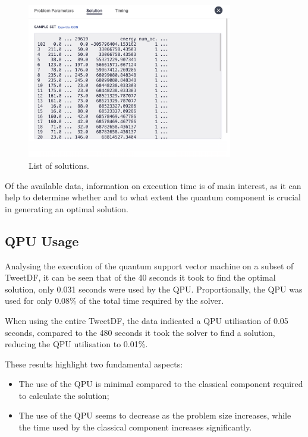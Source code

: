 \begin{figure}
    \centering
    \includegraphics[width=0.8\textwidth]{figures/sampleset.png}
    \caption{List of solutions.}
    \label{fig:sampleset}
\end{figure}

Of the available data, information on execution time is of main interest, as it can help to determine whether and to what extent the quantum component is crucial in generating an optimal solution.

\subsection{QPU Usage}

Analysing the execution of the quantum support vector machine on a subset of TweetDF, it can be seen that of the 40 seconds it took to find the optimal solution, only 0.031 seconds were used by the QPU. Proportionally, the QPU was used for only 0.08\% of the total time required by the solver.

When using the entire TweetDF, the data indicated a QPU utilisation of 0.05 seconds, compared to the 480 seconds it took the solver to find a solution, reducing the QPU utilisation to 0.01\%.

These results highlight two fundamental aspects: 
\begin{itemize} 
	\item The use of the QPU is minimal compared to the classical component required to calculate the solution; 
	\item The use of the QPU seems to decrease as the problem size increases, while the time used by the classical component increases significantly. 
\end{itemize}

